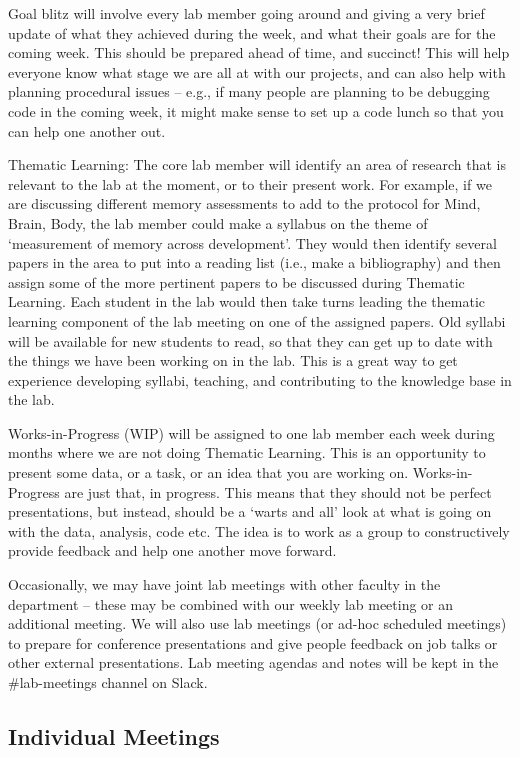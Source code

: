\documentclass[
]{book}
\begin{document}
Goal blitz will involve every lab member going around and giving a very brief update of what they achieved during the week, and what their goals are for the coming week. This should be prepared ahead of time, and succinct! This will help everyone know what stage we are all at with our projects, and can also help with planning procedural issues -- e.g., if many people are planning to be debugging code in the coming week, it might make sense to set up a code lunch so that you can help one another out.

Thematic Learning: The core lab member will identify an area of research that is relevant to the lab at the moment, or to their present work. For example, if we are discussing different memory assessments to add to the protocol for Mind, Brain, Body, the lab member could make a syllabus on the theme of `measurement of memory across development'. They would then identify several papers in the area to put into a reading list (i.e., make a bibliography) and then assign some of the more pertinent papers to be discussed during Thematic Learning. Each student in the lab would then take turns leading the thematic learning component of the lab meeting on one of the assigned papers. Old syllabi will be available for new students to read, so that they can get up to date with the things we have been working on in the lab. This is a great way to get experience developing syllabi, teaching, and contributing to the knowledge base in the lab.

Works-in-Progress (WIP) will be assigned to one lab member each week during months where we are not doing Thematic Learning. This is an opportunity to present some data, or a task, or an idea that you are working on. Works-in-Progress are just that, in progress. This means that they should not be perfect presentations, but instead, should be a `warts and all' look at what is going on with the data, analysis, code etc. The idea is to work as a group to constructively provide feedback and help one another move forward.

Occasionally, we may have joint lab meetings with other faculty in the department -- these may be combined with our weekly lab meeting or an additional meeting. We will also use lab meetings (or ad-hoc scheduled meetings) to prepare for conference presentations and give people feedback on job talks or other external presentations. Lab meeting agendas and notes will be kept in the \#lab-meetings channel on Slack.

\hypertarget{individual-meetings}{%
\subsection{Individual Meetings}\label{individual-meetings}}
\end{document}
